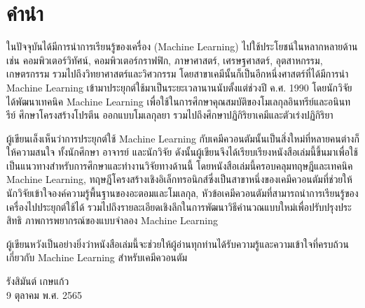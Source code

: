 

{

\chapter*{\centering คำนำ}

ในปัจจุบันได้มีการนำการเรียนรู้ของเครื่อง (Machine Learning) ไปใช้ประโยชน์ในหลากหลายด้าน เช่น คอมพิวเตอร์วิทัศน์, คอมพิวเตอร์กราฟฟิก,
ภาษาศาสตร์, เศรษฐศาสตร์, อุตสาหกรรม, เกษตรกรรม รวมไปถึงวิทยาศาสตร์และวิศวกรรม โดยสาขาเคมีนั้นก็เป็นอีกหนึ่งศาสตร์ที่ได้มีการนำ
Machine Learning เข้ามาประยุกต์ใช้มาเป็นระยะเวลานานนับตั้งแต่ช่วงปี ค.ศ. 1990 โดยนักวิจัยได้พัฒนาเทคนิค Machine Learning
เพื่อใช้ในการศึกษาคุณสมบัติของโมเลกุลอินทรีย์และอนินทรีย์ ศึกษาโครงสร้างโปรตีน ออกแบบโมเลกุลยา รวมไปถึงศึกษาปฏิกิริยาเคมีและตัวเร่งปฏิกิริยา

ผู้เขียนเล็งเห็นว่าการประยุกต์ใช้ Machine Learning กับเคมีควอนตัมนั้นเป็นสิ่งใหม่ที่หลายคนต่างก็ให้ความสนใจ ทั้งนักศึกษา อาจารย์ และนักวิจัย
ดังนั้นผู้เขียนจึงได้เรียบเรียงหนังสือเล่มนี้ขึ้นมาเพื่อใช้เป็นแนวทางสำหรับการศึกษาและทำงานวิจัยทางด้านนี้ โดยหนังสือเล่มนี้ครอบคลุมทฤษฎีและเทคนิค
Machine Learning, ทฤษฎีโครงสร้างเชิงอิเล็กทรอนิกส์ซึ่งเป็นสาขาหนึ่งของเคมีควอนตัมที่ช่วยให้นักวิจัยเข้าใจองค์ความรู้พื้นฐานของอะตอมและโมเลกุล,
หัวข้อเคมีควอนตัมที่สามารถนำการเรียนรู้ของเครื่องไปประยุกต์ใช้ได้ รวมไปถึงรายละเอียดเชิงลึกในการพัฒนาวิธีคำนวณแบบใหม่เพื่อปรับปรุงประสิทธิ%
ภาพการพยากรณ์ของแบบจำลอง Machine Learning

ผู้เขียนหวังเป็นอย่างยิ่งว่าหนังสือเล่มนี้จะช่วยให้ผู้อ่านทุกท่านได้รับความรู้และความเข้าใจที่ครบถ้วนเกี่ยวกับ Machine Learning สำหรับเคมีควอนตัม

\medskip

\begin{flushright}
    รังสิมันต์ เกษแก้ว \\
    9 ตุลาคม พ.ศ. 2565
\end{flushright}
}
